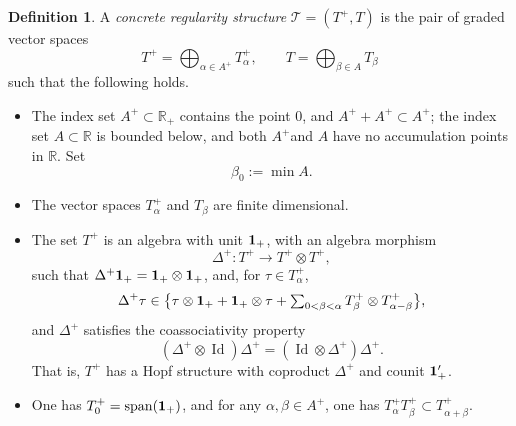 \documentclass[10pt]{amsart}
\DeclareMathOperator{\Span}{span}
\theoremstyle{plain}
\theoremstyle{definition}
\newtheorem*{defn*} {Definition}
\DeclareMathOperator{\iden}{Id}
\newcommand{\bbR}{\mathbb{R}}
\begin{document}
\begin{defn*}
A \emph{{concrete regularity structure}} $\mathscr{T}=(T^+,T)$ is the pair of graded vector spaces\vspace*{-3pt}
\[
T^+ = \bigoplus_{\alpha\in A^+} T_\alpha^+, \qquad T = \bigoplus_{\beta\in A} T_\beta
\]
such that the following holds.
\begin{itemize}
\item The index set $A^{+}\subset \bbR_+$ contains the point $0$, and $A^++A^+ \subset A^+$; the index set $A\subset\bbR$ is bounded below, and both $A^+$and $A$ have no accumulation points in $\bbR$. Set\vspace*{-3pt}
\[
\beta_0 := \min A.
\]

\item The vector spaces $T_\alpha^+$ and $T_\beta$ are finite dimensional.

\item The set $T^+$ is an algebra with unit $\bf 1_+$, with an algebra morphism\vspace*{-3pt}
\[
\Delta^+ : T^+\to T^+\otimes T^+,
\]
such that $\Delta^+{\bf 1}_+ = {\bf 1}_+\otimes {\bf 1}_+$, and, for $\tau\in T_\alpha^+$,\vspace*{-3pt}
\begin{equation} \label{EqDefnDeltaPlus}
\Delta^+\tau \in \bigl\{\tau\otimes {\bf 1}_+ + {\bf 1}_+\otimes \tau + \textstyle\sum_{0<\beta<\alpha} T^+_\beta\otimes T^+_{\alpha-\beta}\bigr\},
\end{equation}
and $\Delta^+$ satisfies the coassociativity property\vspace*{-3pt}
\[
(\Delta^+\otimes\iden )\Delta^+ = (\iden \otimes\Delta^+)\Delta^+.
\]
That is, $T^+$ has a Hopf structure with coproduct $\Delta^+$ and counit ${\bf1}_+'$.

\item One has $T_0^+ = \Span({\bf 1}_+)$, and for any $\alpha,\beta\in A^+$, one has $T_\alpha^+ T_\beta^+ \subset T_{\alpha+\beta}^+$.


\end{itemize}
\end{defn*}
\end{document}
